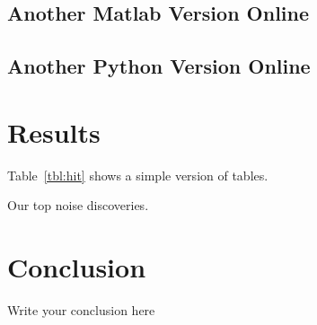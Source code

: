\documentclass[12pt]{article}
\begin{document}
\subsection{Another Matlab Version Online}

\subsection{Another Python Version Online}

\section{Results}

Table~\ref{tbl:hit} shows a simple version of tables.

\begin{table}
  \centering
  
  \caption{Our top noise discoveries.}
  \label{tbl:hit}
\end{table}





\section{Conclusion}

Write your conclusion here



\end{document}
